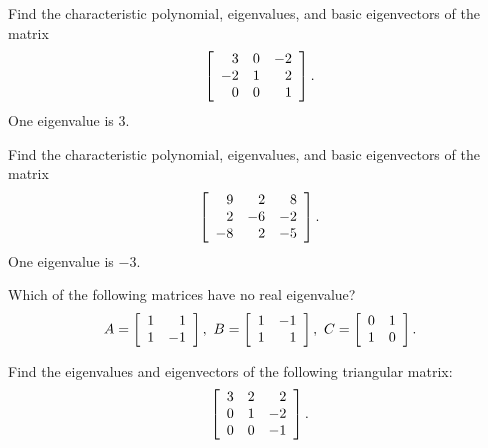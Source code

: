 \documentclass{ximera}
\begin{document}
\begin{problem}
  Find the characteristic polynomial, eigenvalues, and basic
  eigenvectors of the matrix
  \begin{equation*}
    \startmat{rrr}
      3 &   0 &  -2 \\
      -2 &   1 &   2 \\
      0 &   0 &   1 \\
    \stopmat.
  \end{equation*}
  One eigenvalue is $3$.
\end{problem}

\begin{problem}
  Find the characteristic polynomial, eigenvalues, and basic
  eigenvectors of the matrix
  \begin{equation*}
    \startmat{rrr}
      9 & 2 & 8 \\
      2 & -6 & -2 \\
      -8 & 2 & -5 \\
    \stopmat.
  \end{equation*}
  One eigenvalue is $-3$.
\end{problem}

\begin{problem}
  Which of the following matrices have no real eigenvalue?
  \begin{equation*}
    A = \startmat{rr}
      1 & 1 \\
      1 & -1 \\
    \stopmat,
    \quad
    B = \startmat{rr}
      1 & -1 \\
      1 & 1 \\
    \stopmat,
    \quad
    C = \startmat{rr}
      0 & 1 \\
      1 & 0 \\
    \stopmat.
  \end{equation*}
\end{problem}

\begin{problem}
  Find the eigenvalues and eigenvectors of the following triangular
  matrix:
  \begin{equation*}
    \startmat{rrr}
      3 & 2 & 2 \\
      0 & 1 & -2 \\
      0 & 0 & -1 \\
    \stopmat.
  \end{equation*}
\end{problem}
\end{document}

